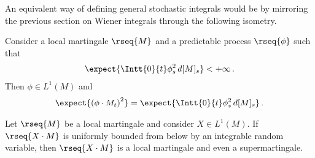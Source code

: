    An equivalent way of defining general stochastic integrals would be by mirroring the previous section on Wiener integrals through the following isometry.
    \begin{property}[It\^o isometry]\label{stoch:ito_isometry}
        Consider a local martingale $\rseq{M}$ and a predictable process $\rseq{\phi}$ such that
        \begin{gather}
            \expect{\Intt{0}{t}\phi^2_s\,d[M]_s}<+\infty\,.
        \end{gather}
        Then $\phi\in L^1(M)$ and 
        \begin{gather}
            \expect{\left(\phi\cdot M_t\right)^2} = \expect{\Intt{0}{t}\phi^2_s\,d[M]_s}\,.
        \end{gather}
    \end{property}

    \begin{property}
        Let $\rseq{M}$ be a local martingale and consider $X\in L^1(M)$. If $\rseq{X\cdot M}$ is uniformly bounded from below by an integrable random variable, then $\rseq{X\cdot M}$ is a local martingale and even a supermartingale.
    \end{property}

